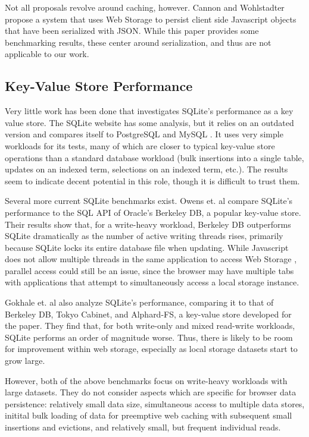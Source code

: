 Not all proposals revolve around caching, however.  Cannon and Wohlstadter \cite{cannon:object_persistence} propose a system that uses Web Storage to persist client side Javascript objects that have been serialized with JSON. While this paper provides some benchmarking results, these center around serialization, and thus are not applicable to our work.

\subsection{Key-Value Store Performance}
\label{subsection:key-value_store_performance}

Very little work has been done that investigates SQLite's performance as a key 
value
store.  The SQLite website has some analysis, but it relies on an outdated 
version and compares itself to PostgreSQL and MySQL \cite{sqlite:speed}.  It
uses very simple workloads for its tests, many of which are closer
to typical key-value store operations than a standard database workload (bulk 
insertions
into a single table, updates on an indexed term, selections on an indexed term,
etc.).  The results seem to indicate decent potential in this role, though it
is difficult to trust them.

Several more current SQLite benchmarks exist. Owens et. al \cite{owens:sqlite-berkeley-db}
compare SQLite's performance to the SQL API of Oracle's Berkeley DB, a popular
key-value store.  Their results show that, for a write-heavy workload, 
Berkeley DB outperforms SQLite
dramatically as the number of active writing threads rises, primarily because
SQLite locks its entire database file when updating.  While Javascript does not
allow multiple threads in the same application to access Web Storage \cite{cannon:object_persistence}, parallel access could
still be an issue, since the browser may have multiple tabs with applications
that attempt to simultaneously access a local storage instance.

Gokhale et. al \cite{gokhale:kvzone} also analyze SQLite's performance, 
comparing it to that of Berkeley DB, Tokyo Cabinet, and Alphard-FS, a 
key-value store developed for the paper.  They find that, for both write-only
and mixed read-write workloads, SQLite performs an order of magnitude worse.
Thus, there is likely to be room for improvement within web storage, especially
as local storage datasets start to grow large.

However, both of the above benchmarks focus on write-heavy workloads with large
datasets.  They do not
consider aspects which are specific for browser data persistence: relatively 
small data size, simultaneous access to multiple data stores, initital bulk 
loading of data for preemptive web caching with subsequent small insertions
and evictions, and relatively small, but frequent individual reads. 
